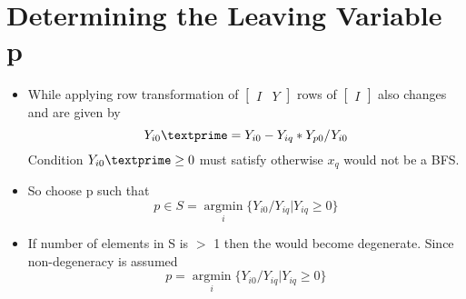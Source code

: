 \documentclass[twoside]{article}
\begin{document}
\section{Determining the Leaving Variable p}
\begin{itemize}
\item While applying row transformation of
$ \left[ \begin{array}{cc}
I &
Y  \end{array} \right]$ rows of $ \left[ \begin{array}{c}
I  \end{array} \right]$ also changes and are given by
\[Y_{i0}\textprime =Y_{i0}-Y_{iq}\ast Y_{p0} / Y_{i0} \]
Condition $Y_{i0}\textprime \ge 0 $ must satisfy otherwise $x_q$ would not be a BFS.
\item So choose p such that
\[p \in S = \underset{i}{\operatorname{argmin}} \{Y_{i0}/Y_{iq} | Y_{iq} \ge 0\}\]
\item If number of elements in S is $>$ 1 then the would become degenerate. Since non-degeneracy is assumed
\[p = \underset{i}{\operatorname{argmin}}\{Y_{i0}/Y_{iq} | Y_{iq} \ge 0\}\]
\end{itemize}
\end{document}
